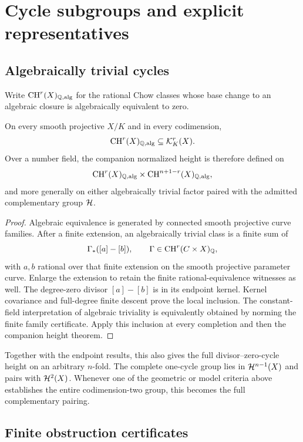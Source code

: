 \section{Cycle subgroups and explicit representatives}\label{sec:cycle-domains}

\subsection{Algebraically trivial cycles}

Write $\operatorname{CH}^r(X)_{\mathbb Q,\mathrm{alg}}$ for the rational Chow classes whose
base change to an algebraic closure is algebraically equivalent
to zero.

\begin{proposition}\label{prop:algebraic-triviality}
On every smooth projective $X/K$ and in every codimension,
\[
 \operatorname{CH}^r(X)_{\mathbb Q,\mathrm{alg}}\subseteq\mathcal K_K^r(X).
\]
Over a number field, the companion normalized height is therefore
defined on
\[
 \operatorname{CH}^r(X)_{\mathbb Q,\mathrm{alg}}\times
 \operatorname{CH}^{n+1-r}(X)_{\mathbb Q,\mathrm{alg}},
\]
and more generally on either algebraically trivial factor paired
with the admitted complementary group $\mathcal H$.
\end{proposition}

\begin{proof}
Algebraic equivalence is generated by connected smooth projective
curve families. After a finite extension, an algebraically trivial
class is a finite sum of
\[
 \Gamma_*([a]-[b]),\qquad
 \Gamma\in\operatorname{CH}^r(C\times X)_\mathbb Q,
\]
with $a,b$ rational over that finite extension on the smooth
projective parameter curve. Enlarge the extension to retain the
finite rational-equivalence witnesses as well.
The degree-zero divisor $[a]-[b]$ is in its endpoint kernel.
Kernel covariance and full-degree finite descent prove the local
inclusion. The constant-field interpretation of algebraic
triviality is equivalently obtained by norming the finite family
certificate. Apply this inclusion at every completion and then
the companion height theorem.
\end{proof}

Together with the endpoint results, this also gives the full
divisor--zero-cycle height on an arbitrary $n$-fold. The complete
one-cycle group lies in $\mathcal H^{n-1}(X)$ and pairs with
$\mathcal H^2(X)$. Whenever one of the geometric or model criteria above
establishes the entire codimension-two group, this becomes the
full complementary pairing.

\subsection{Finite obstruction certificates}

